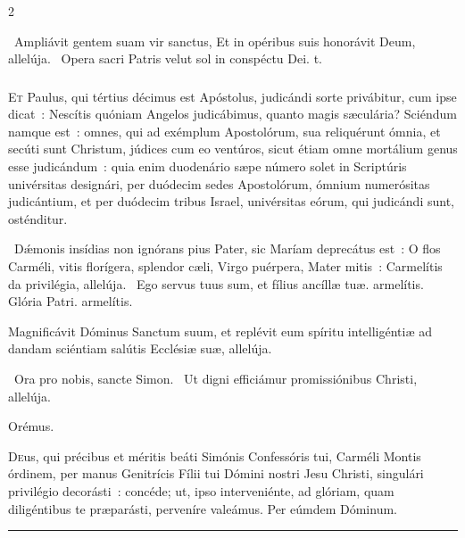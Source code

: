 \documentclass[9pt,twoside]{extarticle}
\begin{document}
\begin{multicols}{2}
\begin{tightlist}{}
\item {}~Ampliávit gentem suam vir sanctus, \textred{*} Et in opéribus suis honorávit Deum, allelúja. ~Opera sacri Patris velut sol in conspéctu Dei. t.
\end{tightlist}

\subsubsection*{\center {}}
\lettrine{E}t Paulus, qui tértius décimus est Apóstolus, judicándi sorte privábitur, cum ipse dicat~: Nescítis quóniam Angelos judicábimus, quanto magis sæculária? Sciéndum namque est~: omnes, qui ad exémplum Apostolórum, sua reliquérunt ómnia, et secúti sunt Christum, júdices cum eo ventúros, sicut étiam omne mortálium genus esse judicándum~: quia enim duodenário sæpe número solet in Scriptúris univérsitas designári, per duódecim sedes Apostolórum, ómnium numerósitas judicántium, et per duódecim tribus Israel, univérsitas eórum, qui judicándi sunt, osténditur.

\begin{tightlist}{}
\item {}~Dǽmonis insídias non ignórans pius Pater, sic Maríam deprecátus est~: O flos Carméli, vitis florígera, splendor cæli, Virgo puérpera, Mater mitis~: \textred{*} Carmelítis da privilégia, allelúja. ~Ego servus tuus sum, et fílius ancíllæ tuæ. armelítis. Glória Patri. armelítis.
\item {}
\item {} Magnificávit Dóminus Sanctum suum, et replévit eum spíritu intelligéntiæ ad dandam sciéntiam salútis Ecclésiæ suæ, allelúja.
\item {}~Ora pro nobis, sancte Simon. ~Ut digni efficiámur promissiónibus Christi, allelúja.
\item Orémus. \hfill {}
\end{tightlist}
\lettrine{D}eus, qui précibus et méritis beáti Simónis Confessóris tui, Carméli Montis órdinem, per manus Genitrícis Fílii tui Dómini nostri Jesu Christi, singulári privilégio decorásti~: concéde; ut, ipso interveniénte, ad glóriam, quam diligéntibus te præparásti, perveníre valeámus. Per eúmdem Dóminum.

\begin{center}\textcolor{red}{\rule{\linewidth}{0.5pt}} \end{center}


\end{multicols}
\end{document}
